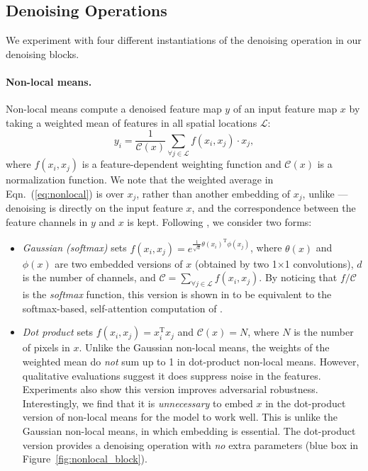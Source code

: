 \documentclass[10pt,twocolumn,letterpaper]{article}
\begin{document}
\subsection{Denoising Operations}

We experiment with four different instantiations of the denoising operation in our denoising blocks.

\paragraph{Non-local means.}
Non-local means \cite{Buades2005} compute a denoised feature map $y$ of an input feature map $x$ by taking a weighted mean of features in all spatial locations $\mathcal{L}$:
\begin{equation}
\label{eq:nonlocal}
y_i = \frac{1}{\mathcal{C}(x)} \sum_{\forall j \in \mathcal{L}} f(x_i, x_j)\cdot x_j,
\end{equation}
where $f(x_i, x_j)$ is a feature-dependent weighting function and $\mathcal{C}(x)$ is a normalization function. 
We note that the weighted average in Eqn.~(\ref{eq:nonlocal}) is over $x_j$, rather than another embedding of $x_j$, unlike \cite{Vaswani2017,Wang2018} --- denoising is directly on the input feature $x$, and the correspondence between the feature channels in $y$ and $x$ is kept.
Following \cite{Wang2018}, we consider two forms: 
\begin{itemize}
\vspace{-.5em}
\item \emph{Gaussian (softmax)} sets $f(x_i, x_j) \!=\! e^{\frac{1}{\sqrt{d}}\theta(x_i)^\text{T} \phi(x_j)}$, where $\theta(x)$ and $\phi(x)$ are two embedded versions of $x$ (obtained by two 1$\times$1 convolutions), $d$ is the number of channels, and $\mathcal{C}\!=\!\sum_{\forall j \in \mathcal{L}} f(x_i,x_j)$. By noticing that $f/\mathcal{C}$ is the \emph{softmax} function, this version is shown in \cite{Wang2018} to be equivalent to the softmax-based, self-attention computation of \cite{Vaswani2017}.

\vspace{-.5em}
\item \emph{Dot product} sets $f(x_i, x_j) = x_i^\text{T} x_j$ and $\mathcal{C}(x) \!=\! N$, where $N$ is the number of pixels in $x$. Unlike the Gaussian non-local means, the weights of the weighted mean do \emph{not} sum up to 1 in dot-product non-local means. However, qualitative evaluations suggest it does suppress noise in the features. Experiments also show this version improves adversarial robustness.
Interestingly, we find that it is \emph{unnecessary} to embed $x$ in the dot-product version of non-local means for the model to work well. This is unlike the Gaussian non-local means, in which embedding is essential. The dot-product version provides a denoising operation with \emph{no} extra parameters (blue box in Figure~\ref{fig:nonlocal_block}).

\end{itemize}
\end{document}

